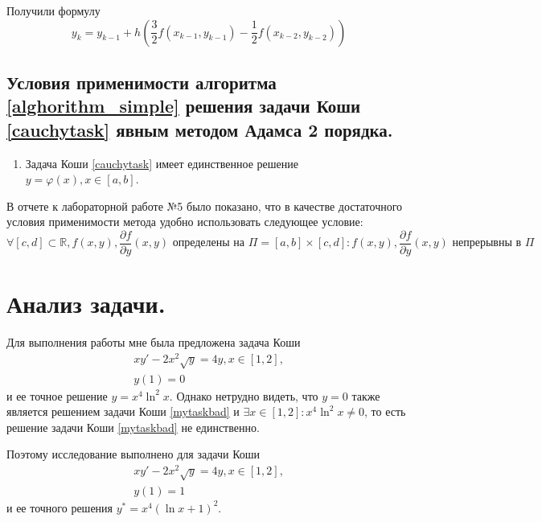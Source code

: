 \documentclass[a4paper, 12pt]{article}
\begin{document}
	Получили формулу
	\begin{equation}
		y_k=y_{k-1}+h(\frac{3}{2}f(x_{k-1},y_{k-1})-\frac{1}{2}f(x_{k-2},y_{k-2}))
	\end{equation}
	
	\subsection{Условия применимости алгоритма \ref{alghorithm_simple} решения задачи Коши \eqref{cauchytask} явным методом Адамса 2 порядка.}
	
	\begin{enumerate}
		\item Задача Коши \eqref{cauchytask} имеет единственное решение $y=\varphi(x), x\in[a,b]$.
	\end{enumerate}
	
	В отчете к лабораторной работе №5 было показано, что в качестве достаточного условия применимости метода удобно использовать следующее условие:
	\begin{equation*}
		\forall [c,d]\subset\mathbb{R}, f(x,y),\dfrac{\partial f}{\partial y}(x,y) \text{ определены на } \Pi=[a,b]\times[c,d] : f(x,y), \dfrac{\partial f}{\partial y}(x,y) \text{ непрерывны в } \Pi 
	\end{equation*}
	
	\section{Анализ задачи.}
	
	Для выполнения работы мне была предложена задача Коши
	\begin{equation} \label{mytaskbad}
		\begin{gathered}
			xy'-2x^2\sqrt{y}=4y, x\in[1,2],\\
			y(1)=0
		\end{gathered}
	\end{equation}
	и ее точное решение $y=x^4\ln^2x$. Однако нетрудно видеть, что $y=0$ также является решением задачи Коши \eqref{mytaskbad} и $\exists x\in[1,2]: x^4\ln^2x\neq0$, то есть решение задачи Коши \eqref{mytaskbad} не единственно.
	
	Поэтому исследование выполнено для задачи Коши
	\begin{equation} \label{mytaskinit}
		\begin{gathered}
			xy'-2x^2\sqrt{y}=4y, x\in[1,2],\\
			y(1)=1
		\end{gathered}
	\end{equation}
	и ее точного решения $y^*=x^4(\ln x+1)^2$. 
	
\end{document}
